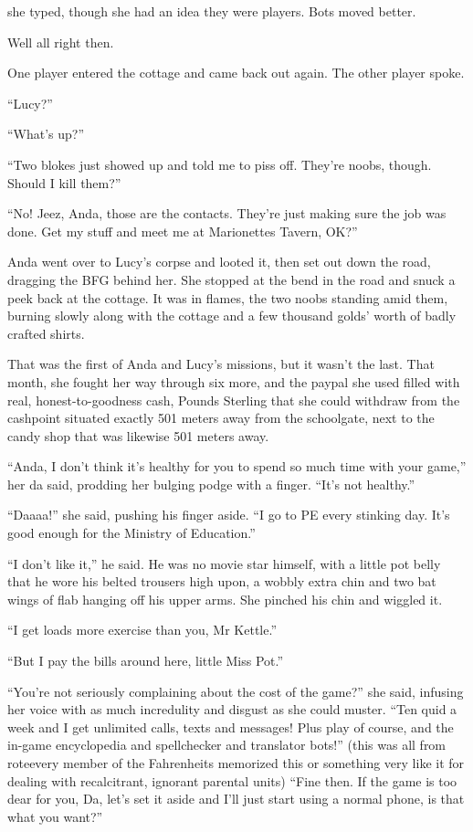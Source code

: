 she typed, though she had an idea they were players. Bots moved
better.

Well all right then.

One player entered the cottage and came back out again. The other
player spoke.

“Lucy?”

“What’s up?”

“Two blokes just showed up and told me to piss off. They’re noobs,
though. Should I kill them?”

“No! Jeez, Anda, those are the contacts. They’re just making sure
the job was done. Get my stuff and meet me at Marionettes Tavern,
OK?”

Anda went over to Lucy’s corpse and looted it, then set out down
the road, dragging the BFG behind her. She stopped at the bend in
the road and snuck a peek back at the cottage. It was in flames,
the two noobs standing amid them, burning slowly along with the
cottage and a few thousand golds’ worth of badly crafted shirts.

\tb

That was the first of Anda and Lucy’s missions, but it wasn’t the
last. That month, she fought her way through six more, and the
paypal she used filled with real, honest-to-goodness cash, Pounds
Sterling that she could withdraw from the cashpoint situated
exactly 501 meters away from the schoolgate, next to the candy shop
that was likewise 501 meters away.

“Anda, I don’t think it’s healthy for you to spend so much time
with your game,” her da said, prodding her bulging podge with a
finger. “It’s not healthy.”

“Daaaa!” she said, pushing his finger aside. “I go to PE every
stinking day. It’s good enough for the Ministry of Education.”

“I don’t like it,” he said. He was no movie star himself, with a
little pot belly that he wore his belted trousers high upon, a
wobbly extra chin and two bat wings of flab hanging off his upper
arms. She pinched his chin and wiggled it.

“I get loads more exercise than you, Mr Kettle.”

“But I pay the bills around here, little Miss Pot.”

“You’re not seriously complaining about the cost of the game?” she
said, infusing her voice with as much incredulity and disgust as
she could muster. “Ten quid a week and I get unlimited calls, texts
and messages! Plus play of course, and the in-game encyclopedia and
spellchecker and translator bots!” (this was all from rote\dash{}every
member of the Fahrenheits memorized this or something very like it
for dealing with recalcitrant, ignorant parental units) “Fine then.
If the game is too dear for you, Da, let’s set it aside and I’ll
just start using a normal phone, is that what you want?”

